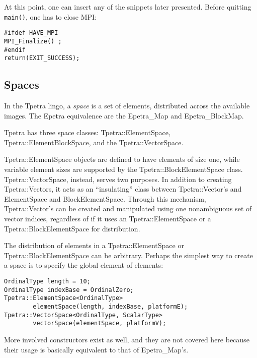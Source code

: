 At this point, one can insert any of the snippets later presented. Before
quitting \verb!main()!, one has to close MPI:
\begin{verbatim}
#ifdef HAVE_MPI
MPI_Finalize() ;
#endif
return(EXIT_SUCCESS);
\end{verbatim}

\subsection{Spaces}
\label{sec:tpetra_spaces}

In the Tpetra lingo, a {\sl space} is a set of elements, distributed across
the available images. The Epetra equivalence are the Epetra\_Map and
Epetra\_BlockMap. 

Tpetra has three space classes: Tpetra::ElementSpace, Tpetra::ElementBlockSpace,
  and the Tpetra::VectorSpace.

Tpetra::ElementSpace objects are defined to have elements of size one, while
variable element sizes are supported by the Tpetra::BlockElementSpace class.
Tpetra::VectorSpace, instead, serves two purposes. In addition to creating
Tpetra::Vectors, it acts as an ``insulating'' class between Tpetra::Vector's
and ElementSpace and BlockElementSpace. Through this mechanism,
  Tpetra::Vector's can be created and manipulated using one nonambiguous set
  of vector indices, regardless of if it uses an Tpetra::ElementSpace or a
  Tpetra::BlockElementSpace for distribution. 

\smallskip

The distribution of elements in a Tpetra::ElementSpace or
Tpetra::BlockElementSpace can be arbitrary. Perhaps 
the simplest way to create a space is to specify the global element of
elements:
\begin{verbatim}
OrdinalType length = 10;
OrdinalType indexBase = OrdinalZero;
Tpetra::ElementSpace<OrdinalType> 
        elementSpace(length, indexBase, platformE);
Tpetra::VectorSpace<OrdinalType, ScalarType> 
        vectorSpace(elementSpace, platformV);
\end{verbatim}
More involved constructors exist as well, and they are not covered here
because their usage is basically equivalent to that of Epetra\_Map's.

